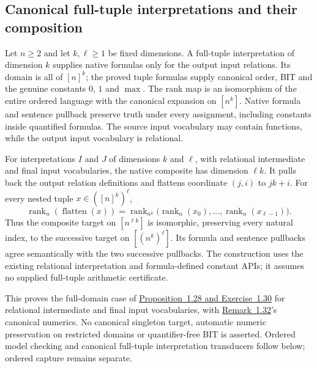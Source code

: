 \begin{result}
\subsection{Canonical full-tuple interpretations and their composition}
Let $n\ge2$ and let $k,\ell\ge1$ be fixed dimensions. A full-tuple interpretation
of dimension $k$ supplies native formulas only for the output input relations.
Its domain is all of $[n]^k$; the proved tuple formulas supply canonical order,
BIT and the genuine constants $0$, $1$ and $\max$. The rank map is an isomorphism
of the entire ordered language with the canonical expansion on $[n^k]$.
Native formula and sentence pullback preserve truth under every assignment,
including constants inside quantified formulas. The source input vocabulary may
contain functions, while the output input vocabulary is relational.

For interpretations $I$ and $J$ of dimensions $k$ and $\ell$, with relational
intermediate and final input vocabularies, the native composite has dimension
$\ell k$. It pulls back the output relation definitions and flattens coordinate
$(j,i)$ to $jk+i$. For every nested tuple $x\in([n]^k)^\ell$,
\[
\operatorname{rank}_n(\operatorname{flatten}(x))
=\operatorname{rank}_{n^k}\bigl(
  \operatorname{rank}_n(x_0),\ldots,\operatorname{rank}_n(x_{\ell-1})\bigr).
\]
Thus the composite target on $[n^{\ell k}]$ is isomorphic, preserving every
natural index, to the successive target on $[(n^k)^\ell]$. Its formula and
sentence pullbacks agree semantically with the two successive pullbacks.
The construction uses the existing relational interpretation and formula-defined
constant APIs; it assumes no supplied full-tuple arithmetic certificate.

This proves the full-domain case of
\href{https://people.cs.umass.edu/~immerman/book/ch0_1_2.pdf\#page=36}{Proposition~1.28
and Exercise~1.30} for relational intermediate and final input vocabularies, with
\href{https://people.cs.umass.edu/~immerman/book/ch0_1_2.pdf\#page=37}{Remark~1.32}'s
canonical numerics.\citep{Immerman1999}
No canonical singleton target, automatic numeric preservation on restricted
domains or quantifier-free BIT is asserted. Ordered model checking and canonical full-tuple
interpretation transducers follow below; ordered capture remains separate.
\end{result}

